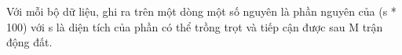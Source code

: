Với mỗi bộ dữ liệu, ghi ra trên một dòng một số nguyên là phần nguyên của (s * 100) với s là diện tích của phần có thể trồng trọt và tiếp cận được sau M trận động đất.  

\